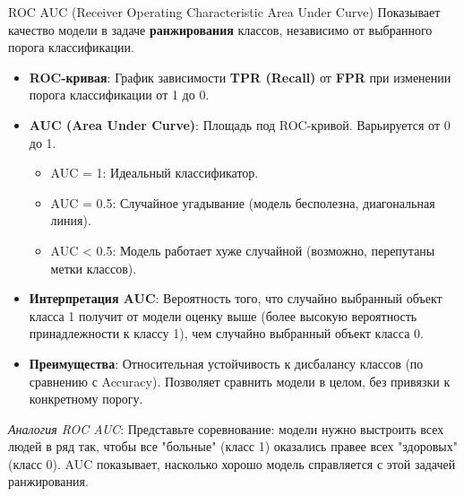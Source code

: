 \begin{myexampleblock}{ROC AUC (Receiver Operating Characteristic Area Under Curve)}
    Показывает качество модели в задаче \textbf{ранжирования} классов, независимо от выбранного порога классификации.
    \begin{itemize}
        \item \textbf{ROC-кривая}: График зависимости \textbf{TPR (Recall)} от \textbf{FPR} при изменении порога классификации от 1 до 0.
        \item \textbf{AUC (Area Under Curve)}: Площадь под ROC-кривой. Варьируется от 0 до 1.
            \begin{itemize}
                \item AUC = 1: Идеальный классификатор.
                \item AUC = 0.5: Случайное угадывание (модель бесполезна, диагональная линия).
                \item AUC < 0.5: Модель работает хуже случайной (возможно, перепутаны метки классов).
            \end{itemize}
        \item \textbf{Интерпретация AUC}: Вероятность того, что случайно выбранный объект класса 1 получит от модели оценку выше (более высокую вероятность принадлежности к классу 1), чем случайно выбранный объект класса 0.
        \item \textbf{Преимущества}: Относительная устойчивость к дисбалансу классов (по сравнению с Accuracy). Позволяет сравнить модели в целом, без привязки к конкретному порогу.
    \end{itemize}
    \textit{Аналогия ROC AUC}: Представьте соревнование: модели нужно выстроить всех людей в ряд так, чтобы все "больные" (класс 1) оказались правее всех "здоровых" (класс 0). AUC показывает, насколько хорошо модель справляется с этой задачей ранжирования.

    \begin{center} %
    \end{center}
\end{myexampleblock}

